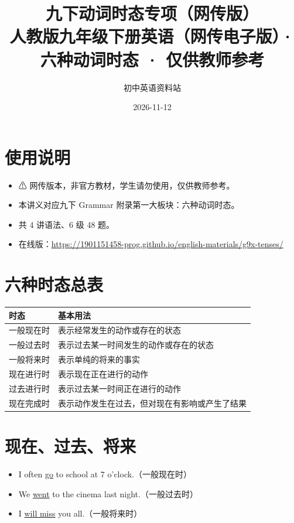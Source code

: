 \documentclass[11pt,a4paper]{ctexart}
\title{\textbf{九下动词时态专项（网传版）}\\[4pt]
\large 人教版九年级下册英语（网传电子版）· 六种动词时态 · 仅供教师参考}
\author{初中英语资料站}
\date{2026-11-12}
\begin{document}
\maketitle

\section*{使用说明}
\begin{itemize}[leftmargin=1.4em]
\item ⚠ 网传版本，非官方教材，学生请勿使用，仅供教师参考。
\item 本讲义对应九下 Grammar 附录第一大板块：六种动词时态。
\item 共 4 讲语法、6 级 48 题。
\item 在线版：\url{https://1901151458-prog.github.io/english-materials/g9x-tenses/}
\end{itemize}

\begin{center}
\end{center}
\bigskip
\section{六种时态总表}
\begin{center}
\begin{tabular}{p{2.8cm}p{9.4cm}}
\hline
\textbf{时态} & \textbf{基本用法}\\
\hline
一般现在时 & 表示经常发生的动作或存在的状态\\
一般过去时 & 表示过去某一时间发生的动作或存在的状态\\
一般将来时 & 表示单纯的将来的事实\\
现在进行时 & 表示现在正在进行的动作\\
过去进行时 & 表示过去某一时间正在进行的动作\\
现在完成时 & 表示动作发生在过去，但对现在有影响或产生了结果\\
\hline
\end{tabular}
\end{center}

\section{现在、过去、将来}
\begin{itemize}[leftmargin=1.4em]
\item I often \underline{go} to school at 7 o'clock.（一般现在时）
\item We \underline{went} to the cinema last night.（一般过去时）
\item I \underline{will miss} you all.（一般将来时）
\end{itemize}
\end{document}
